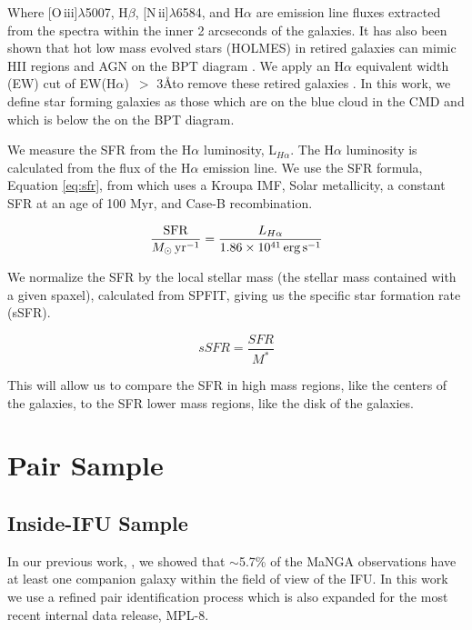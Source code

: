 \documentclass[iop,revtex4,twocolumn,apj,numberedappendix,appendixfloats]{emulateapj}
\newcommand{\OIII}{[O\,{\sc iii}]}
\newcommand{\NII}{[N\,{\sc ii}]}
\newcommand{\angstrom}{\mbox{\normalfont\AA}}
\newcommand{\ewha}{EW(H$\alpha$)}
\begin{document}
Where \OIII$\lambda$5007, H$\beta$, \NII$\lambda$6584, and H$\alpha$ are emission line fluxes extracted from the spectra within the inner 2 arcseconds of the galaxies. It has also been shown that hot low mass evolved stars (HOLMES) in retired galaxies can mimic HII regions and AGN on the BPT diagram \citep{Stasinska:2008}. We apply an H$\alpha$ equivalent width (EW) cut of \ewha\ $>$ 3\angstrom to remove these retired galaxies \citet{Cid-Fernandes:2011}. In this work, we define star forming galaxies as those which are on the blue cloud in the CMD and which is below the \citet{Kewley:2001} on the BPT diagram.

We measure the SFR from the H$\alpha$ luminosity, L$_{H\alpha}$. The H$\alpha$ luminosity is calculated from the flux of the H$\alpha$ emission line. We use the SFR formula, Equation \ref{eq:sfr}, from \citet{Murphy:2011} which uses a Kroupa IMF, Solar metallicity, a constant SFR at an age of 100 Myr, and Case-B recombination. 

\begin{equation}\label{eq:sfr}
\frac{\rm{SFR}}{M_{\odot} \, \rm{yr^{-1}}} = \frac{L_{H\alpha}}{1.86 \times 10^{41}\, \rm{erg\,s}^{-1}}
\end{equation}

We normalize the SFR by the local stellar mass (the stellar mass contained with a given spaxel), calculated from SPFIT, giving us the specific star formation rate (sSFR). 

\begin{equation}
sSFR = \frac{SFR}{M^*}
\end{equation}

This will allow us to compare the SFR in high mass regions, like the centers of the galaxies, to the SFR lower mass regions, like the disk of the galaxies.

\section{Pair Sample}\label{sec:pair}

\subsection{Inside-IFU Sample}\label{sec:inside}
In our previous work, \citet{Fu:2018}, we showed that $\sim$5.7\% of the MaNGA observations have at least one companion galaxy within the field of view of the IFU. In this work we use a refined pair identification process which is also expanded for the most recent internal data release, MPL-8.
\end{document}
